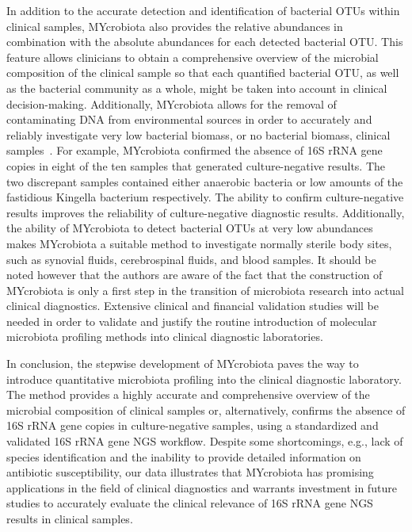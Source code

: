 In addition to the accurate detection and identification of bacterial OTUs within clinical samples, MYcrobiota also provides the relative
abundances in combination with the absolute abundances for each detected bacterial OTU\@. This feature allows clinicians to obtain a comprehensive
overview of the microbial composition of the clinical sample so that each quantified bacterial OTU, as well as the bacterial community as a whole,
might be taken into account in clinical decision-making. Additionally, MYcrobiota allows for the removal of contaminating DNA from environmental
sources in order to accurately and reliably investigate very low bacterial biomass, or no bacterial biomass, clinical samples~\cite{boers2017novel}. For example,
MYcrobiota confirmed the absence of 16S rRNA gene copies in eight of the ten samples that generated culture-negative results. The two discrepant
samples contained either anaerobic bacteria or low amounts of the fastidious Kingella bacterium respectively. The ability to confirm culture-negative
results improves the reliability of culture-negative diagnostic results. Additionally, the ability of MYcrobiota to detect bacterial OTUs at very low
abundances makes MYcrobiota a suitable method to investigate normally sterile body sites, such as synovial fluids, cerebrospinal fluids, and blood samples.
It should be noted however that the authors are aware of the fact that the construction of MYcrobiota is only a first step in the transition of microbiota
research into actual clinical diagnostics. Extensive clinical and financial validation studies will be needed in order to validate and justify the routine
introduction of molecular microbiota profiling methods into clinical diagnostic laboratories.

In conclusion, the stepwise development of MYcrobiota paves the way to introduce quantitative microbiota profiling into the clinical diagnostic
laboratory. The method provides a highly accurate and comprehensive overview of the microbial composition of clinical samples or, alternatively,
confirms the absence of 16S rRNA gene copies in culture-negative samples, using a standardized and validated 16S rRNA gene NGS workflow. Despite
some shortcomings, e.g., lack of species identification and the inability to provide detailed information on antibiotic susceptibility, our data
illustrates that MYcrobiota has promising applications in the field of clinical diagnostics and warrants investment in future studies to accurately
evaluate the clinical relevance of 16S rRNA gene NGS results in clinical samples.

